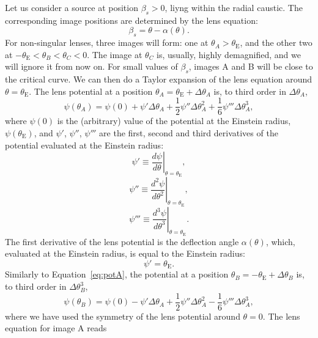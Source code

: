 \documentclass[usenatbib]{mnras}
\def\psio{\psi(0)}
\def\psii{\psi'}
\def\psiii{\psi''}
\def\psiiii{\psi'''}
\def\tein{\theta_{\mathrm{E}}}
\def\Eref#1{Equation~\ref{#1}\xspace}
\begin{document}
Let us consider a source at position $\beta_s>0$, liyng within the radial caustic.
The corresponding image positions are determined by the lens equation:
\begin{equation}
\beta_s = \theta  - \alpha(\theta).
\end{equation}
For non-singular lenses, three images will form: one at $\theta_A > \tein$, and the other two at $-\tein < \theta_B < \theta_C < 0$.
The image at $\theta_C$ is, usually, highly demagnified, and we will ignore it from now on.
For small values of $\beta_s$, images A and B will be close to the critical curve. We can then do a Taylor expansion of the lens equation around $\theta=\tein$.
The lens potential at a position $\theta_A = \tein + \Delta\theta_A$ is, to third order in $\Delta\theta_A$,
\begin{equation}\label{eq:potA}
\psi(\theta_A) = \psio + \psii \Delta\theta_A + \frac12 \psiii \Delta\theta_A^2 + \frac16 \psiiii \Delta\theta_A ^ 3,
\end{equation}
where $\psio$ is the (arbitrary) value of the potential at the Einstein radius, $\psi(\tein)$, and $\psii$, $\psiii$, $\psiiii$ are the first, second and third derivatives of the potential evaluated at the Einstein radius:
\begin{equation}
\psii \equiv \left. \frac{d\psi}{d\theta} \right\rvert_{\theta=\tein},
\end{equation}
\begin{equation}
\psiii \equiv \left. \frac{d^2\psi}{d\theta^2} \right\rvert_{\theta=\tein},
\end{equation}
\begin{equation}
\psiiii \equiv \left. \frac{d^3\psi}{d\theta^3} \right\rvert_{\theta=\tein}.
\end{equation}
The first derivative of the lens potential is the deflection angle $\alpha(\theta)$, which, evaluated at the Einstein radius, is equal to the Einstein radius:
\begin{equation}\label{eq:rein}
\psii = \tein.
\end{equation}
Similarly to \Eref{eq:potA}, the potential at a position $\theta_B = -\tein + \Delta\theta_B$ is, to third order in $\Delta\theta_B^3$,
\begin{equation}\label{eq:potB}
\psi(\theta_B) = \psio - \psii \Delta\theta_A + \frac12 \psiii \Delta\theta_A^2 - \frac16 \psiiii \Delta\theta_A ^ 3,
\end{equation}
where we have used the symmetry of the lens potential around $\theta = 0$.
The lens equation for image A reads
\end{document}
